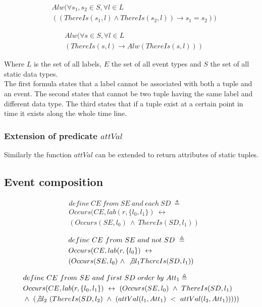 \begin{align*}
  &Alw(\forall s_1,s_2 \in S, \forall l \in L\\
  &((ThereIs(s_1, l) \wedge ThereIs(s_2, l)) \rightarrow s_1=s_2))
\end{align*}

\begin{align*}
  &Alw(\forall s \in S, \forall l \in L\\
  &(ThereIs(s, l) \rightarrow Alw(ThereIs(s, l)))
\end{align*}

Where $L$ is the set of all labels, $E$ the set of all event types and $S$ the set of all static data types.\\
The first formula states that a label cannot be associated with both a tuple and an event. The second states that cannot be two tuple having the same label and different data type. The third states that if a tuple exist at a certain point in time it exists along the whole time line.

\subsubsection{Extension of predicate $attVal$}
Similarly the function $attVal$ can be extended to return attributes of static tuples.

\subsection{Event composition}
\begin{align*}%
&define\ CE\ from\ SE\ and\ each\ SD\ \triangleq\\
&Occurs(CE, lab(r, \{l_0, l_1\})\ \leftrightarrow\\
&(Occurs(SE, l_0)\ \wedge\ ThereIs(SD, l_1))
\end{align*}

\begin{align*}%
&define\ CE\ from\ SE\ and\ not\ SD\ \triangleq\\
&Occurs(CE, lab(r, \{l_0\})\ \leftrightarrow\\
&(Occurs(SE, l_0)\ \wedge\ \not \exists l_1 ThereIs(SD, l_1))
\end{align*}

\begin{align*}%
&define\ CE\ from\ SE\ and\ first\ SD\ order\ by\ Att_1\triangleq\\
&Occurs(CE, lab(r, \{l_0, l_1\})\ \leftrightarrow\ (Occurs(SE, l_0)\ \wedge\ ThereIs(SD, l_1)\\
&\wedge\ (\not \exists l_2\ (ThereIs(SD, l_2)\ \wedge\ (attVal(l_1, Att_1)\ <\ attVal(l_2, Att_1)))))
\end{align*}

